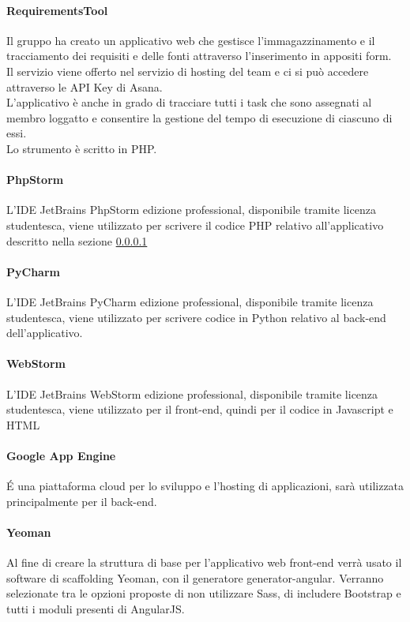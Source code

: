 			\paragraph{RequirementsTool}
			\label{par:requirements_tool}
			Il gruppo ha creato un applicativo web che gestisce l'immagazzinamento e il tracciamento dei requisiti e delle fonti attraverso l'inserimento in appositi form. \\
			Il servizio viene offerto nel servizio di hosting del team e ci si può accedere attraverso le API Key di Asana. \\
			L'applicativo è anche in grado di tracciare tutti i task che sono assegnati al membro loggatto e consentire la gestione del tempo di esecuzione di ciascuno di essi. \\
			Lo strumento è scritto in PHP.

			\paragraph{PhpStorm} %
			\label{par:php_storm}
			L'IDE JetBrains PhpStorm edizione professional, disponibile tramite licenza studentesca, viene utilizzato per scrivere il codice PHP relativo all'applicativo descritto nella sezione \ref{par:requirements_tool}
			\paragraph{PyCharm}
			L'IDE JetBrains PyCharm edizione professional, disponibile tramite licenza studentesca, viene utilizzato per scrivere codice in Python relativo al back-end dell'applicativo.
			\paragraph{WebStorm} %
			\label{par:webstorm}
			L'IDE JetBrains WebStorm edizione professional, disponibile tramite licenza studentesca, viene utilizzato per il front-end, quindi per il codice in Javascript e HTML
			\paragraph{Google App Engine}
			\'E una piattaforma cloud per lo sviluppo e l'hosting di applicazioni, sarà utilizzata principalmente per il back-end.

			\paragraph{Yeoman}
			\label{par:yeoman}
			Al fine di creare la struttura di base per l'applicativo web front-end verrà usato il software di scaffolding Yeoman, con il generatore generator-angular. \newline
			Verranno selezionate tra le opzioni proposte di non utilizzare Sass, di includere Bootstrap e tutti i moduli presenti di AngularJS.
